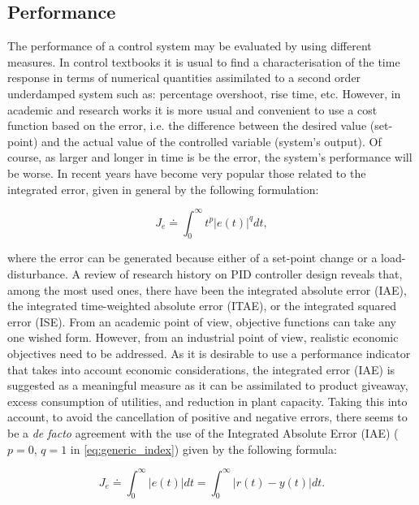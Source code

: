  \subsection{Performance}

The performance of a control system may be evaluated by using different measures. In control textbooks it is usual to find a characterisation of the time response in terms of numerical quantities assimilated to a second order underdamped system such as: percentage overshoot, rise time, etc. However, in academic and research works it is more usual and convenient to use a cost function based on the error, i.e. the difference between the desired value (set-point) and the actual value of the controlled variable (system's output).  Of course, as larger and longer in time is be the error, the system's performance will be worse. In recent years have become very popular those related to the integrated error, given in general by the following formulation:
 
\begin{equation}
	J_{e} \doteq \int^{\infty}_{0} t^p \left|e(t)\right|^q dt,  \label{eq:generic_index}
\end{equation}

\noindent where the error can be generated because either of a set-point change or a load-disturbance.
A review of research history on PID controller design reveals that, among the most used ones, there have been the integrated absolute error (IAE), the integrated time-weighted absolute error (ITAE), or the integrated squared error (ISE). From an academic point of view, objective functions can take any one wished form. However, from an industrial point of view, realistic economic objectives need to be addressed. As it is desirable to use a performance indicator that takes into account economic considerations, the integrated error (IAE) is suggested \cite{shinskey2002} as a meaningful measure as it can be assimilated to product giveaway, excess consumption of utilities, and reduction in plant capacity. Taking this into account, to avoid the cancellation of positive and negative errors, there seems to be a \emph{de facto} agreement with the use of the Integrated Absolute Error (IAE) ($p=0$, $q=1$ in \ref{eq:generic_index}) given by the following formula:

\begin{equation}
	J_e \doteq \int^{\infty}_{0} \left|e(t) \right| dt = \int^{\infty}_{0} \left|r(t)-y(t) \right| dt. 
\end{equation}





